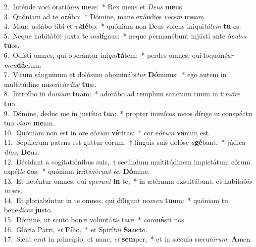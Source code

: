 {2.~}Inténde voci oratió\textit{nis} \textbf{me}æ:~* Rex meus et \textit{De}\textit{us} \textbf{me}us.\\
{3.~}Quóniam ad te \textit{o}\textbf{rá}bo:~* Dómine, mane exáudies \textit{vo}\textit{cem} \textbf{me}am.\\
{4.~}Mane astábo tibi et \textit{vi}\textbf{dé}bo:~* quóniam non Deus volens iniqui\textit{tá}\textit{tem} \textbf{tu} es.\\
{5.~}Neque habitábit juxta te \textit{ma}\textbf{lí}gnus:~* neque permanébunt injústi ante ó\textit{cu}\textit{los} \textbf{tu}os.\\
{6.~}Odísti omnes, qui operántur ini\textit{qui}\textbf{tá}tem:~* perdes omnes, qui loquún\textit{tur} \textit{men}\textbf{dá}cium.\\
{7.~}Virum sánguinum et dolósum abominábi\textit{tur} \textbf{Dó}minus:~* ego autem in multitúdine misericór\textit{di}\textit{æ} \textbf{tu}æ.\\
{8.~}Introíbo in do\textit{mum} \textbf{tu}am:~* adorábo ad templum sanctum tuum in ti\textit{mó}\textit{re} \textbf{tu}o.\\
{9.~}Dómine, deduc me in justíti\textit{a} \textbf{tu}a:~* propter inimícos meos dírige in conspéctu tuo \textit{vi}\textit{am} \textbf{me}am.\\
{10.~}Quóniam non est in ore eó\textit{rum} \textbf{vé}ritas:~* cor e\textit{ó}\textit{rum} \textbf{va}num est.\\
{11.~}Sepúlcrum patens est guttur eórum,~† linguis suis dolóse \textit{a}\textbf{gé}bant,~* júdica \textit{il}\textit{los}, \textbf{De}us.\\
{12.~}Décidant a cogitatiónibus suis,~† secúndum multitúdinem impietátum eórum expél\textit{le} \textbf{e}os,~* quóniam irritavé\textit{runt} \textit{te}, \textbf{Dó}mine.\\
{13.~}Et læténtur omnes, qui spe\textit{rant} \textbf{in} te,~* in ætérnum exsultábunt: et habitá\textit{bis} \textit{in} \textbf{e}is.\\
{14.~}Et gloriabúntur in te omnes, qui díligunt no\textit{men} \textbf{tu}um:~* quóniam tu bene\textit{dí}\textit{ces} \textbf{ju}sto.\\
{15.~}Dómine, ut scuto bonæ voluntá\textit{tis} \textbf{tu}æ~* \textit{co}\textit{ro}\textbf{ná}sti nos.\\
{16.~}Glória Patri, \textit{et} \textbf{Fí}lio,~* et Spirí\textit{tu}\textit{i} \textbf{San}cto.\\
{17.~}Sicut erat in princípio, et nunc, \textit{et} \textbf{sem}per,~* et in sǽcula sæcu\textit{ló}\textit{rum}. \textbf{A}men.\\

